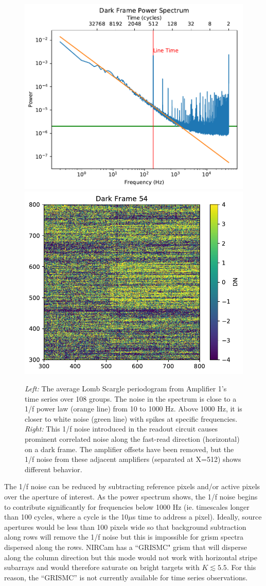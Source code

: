 \documentclass[]{aastex62}
\begin{document}
\begin{figure}[!hbtp]
\centering
\includegraphics[width=.4\columnwidth]{avg_psd_amp_1.pdf}
\includegraphics[width=.4\columnwidth]{preamp_removed_grp_54.pdf}
\caption{{\it Left:} The average Lomb Scargle periodogram from Amplifier 1's time series over 108 groups.
The noise in the spectrum is close to a 1/f power law (orange line) from 10 to 1000 Hz.
Above 1000 Hz, it is closer to white noise (green line) with spikes at specific frequencies.
{\it Right:} This 1/f noise introduced in the readout circuit causes prominent correlated noise along the fast-read direction (horizontal) on a dark frame.
The amplifier offsets have been removed, but the 1/f noise from these adjacent amplifiers (separated at X=512) shows different behavior.
}\label{fig:pixelTSeriesPSpec}
\end{figure}

The 1/f noise can be reduced by subtracting reference pixels and/or active pixels over the aperture of interest.
As the power spectrum shows, the 1/f noise begins to contribute significantly for frequencies below 1000 Hz (ie. timescales longer than 100 cycles, where a cycle is the 10$\mu$s time to address a pixel).
Ideally, source apertures would be less than 100 pixels wide so that background subtraction along rows will remove the 1/f noise but this is impossible for grism spectra dispersed along the rows.
NIRCam has a ``GRISMC" grism that will disperse along the column direction but this mode would not work with horizontal stripe subarrays and would therefore saturate on bright targets with $K \lesssim 5.5$.
For this reason, the ``GRISMC'' is not currently available for time series observations.
\end{document}
